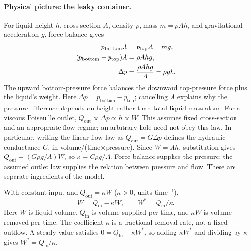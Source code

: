 \paragraph{Physical picture: the leaky container.}
For liquid height $h$, cross-section $A$, density $\rho$, mass $m=\rho Ah$, and gravitational acceleration $g$, force balance gives
\begin{align}
p_{\mathrm{bottom}}A&=p_{\mathrm{top}}A+mg,\label{eq:hydrostatic-balance}\\
(p_{\mathrm{bottom}}-p_{\mathrm{top}})A&=\rho Ahg,\notag\\
\Delta p&=\frac{\rho Ahg}{A}=\rho gh.\label{eq:hydrostatic-pressure}
\end{align}
The upward bottom-pressure force balances the downward top-pressure force plus the liquid's weight. Here $\Delta p=p_{\mathrm{bottom}}-p_{\mathrm{top}}$; cancelling $A$ explains why the pressure difference depends on height rather than total liquid mass alone.
For a viscous Poiseuille outlet, $Q_{\mathrm{out}}\propto\Delta p\propto h\propto W$. This assumes fixed cross-section and an appropriate flow regime; an arbitrary hole need not obey this law.
In particular, writing the linear flow law as $Q_{\mathrm{out}}=G\Delta p$ defines the hydraulic conductance $G$, in volume/(time$\times$pressure). Since $W=Ah$, substitution gives $Q_{\mathrm{out}}=(G\rho g/A)W$, so $\kappa=G\rho g/A$. Force balance supplies the pressure; the assumed outlet law supplies the relation between pressure and flow. These are separate ingredients of the model.

With constant input and $Q_{\mathrm{out}}=\kappa W$ ($\kappa>0$, units time$^{-1}$),
\begin{equation}\label{eq:container-dynamics}
\dot W=Q_{\mathrm{in}}-\kappa W,\qquad W^*=Q_{\mathrm{in}}/\kappa.
\end{equation}
Here $W$ is liquid volume, $Q_{\mathrm{in}}$ is volume supplied per time, and $\kappa W$ is volume removed per time. The coefficient $\kappa$ is a fractional removal rate, not a fixed outflow. A steady value satisfies $0=Q_{\mathrm{in}}-\kappa W^*$, so adding $\kappa W^*$ and dividing by $\kappa$ gives $W^*=Q_{\mathrm{in}}/\kappa$.

